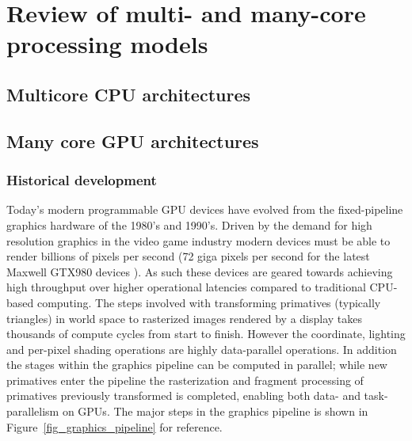 \chapter{Review of multi- and many-core processing models}
\section{Multicore CPU architectures}
\section{Many core GPU architectures}
\subsection{Historical development}
Today's modern programmable GPU devices have evolved from the fixed-pipeline graphics hardware of the 1980's and 1990's. Driven by the demand
for high resolution graphics in the video game industry modern devices must be able to render billions of pixels per second (72 giga pixels per second 
for the latest Maxwell GTX980 devices \cite{gtx980}). As such these devices are geared towards achieving high throughput over higher operational latencies compared to traditional
CPU-based computing. The steps involved with transforming primatives (typically triangles) in world space to rasterized images rendered by a display takes thousands
of compute cycles from start to finish. However the coordinate, lighting and per-pixel shading operations are highly data-parallel operations. In addition the stages within
the graphics pipeline can be computed in parallel; while new primatives enter the pipeline the rasterization and fragment processing of primatives previously transformed is 
completed, enabling both data- and task-parallelism on GPUs. The major steps in the graphics pipeline is shown in Figure~\ref{fig_graphics_pipeline} for reference.

